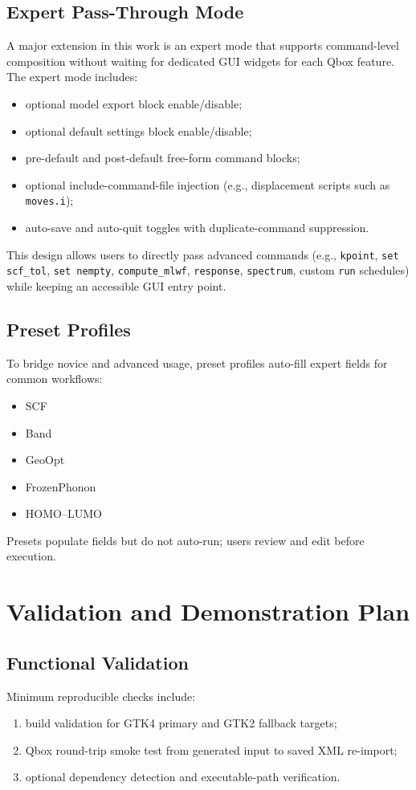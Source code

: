 \documentclass[11pt,a4paper]{article}
\begin{document}
\subsection{Expert Pass-Through Mode}
A major extension in this work is an expert mode that supports command-level composition without waiting for dedicated GUI widgets for each Qbox feature.
The expert mode includes:
\begin{itemize}
  \item optional model export block enable/disable;
  \item optional default settings block enable/disable;
  \item pre-default and post-default free-form command blocks;
  \item optional include-command-file injection (e.g., displacement scripts such as \texttt{moves.i});
  \item auto-save and auto-quit toggles with duplicate-command suppression.
\end{itemize}

This design allows users to directly pass advanced commands (e.g., \texttt{kpoint}, \texttt{set scf\_tol}, \texttt{set nempty}, \texttt{compute\_mlwf}, \texttt{response}, \texttt{spectrum}, custom \texttt{run} schedules) while keeping an accessible GUI entry point.

\subsection{Preset Profiles}
To bridge novice and advanced usage, preset profiles auto-fill expert fields for common workflows:
\begin{itemize}
  \item SCF
  \item Band
  \item GeoOpt
  \item FrozenPhonon
  \item HOMO--LUMO
\end{itemize}
Presets populate fields but do not auto-run; users review and edit before execution.

\section{Validation and Demonstration Plan}
\subsection{Functional Validation}
Minimum reproducible checks include:
\begin{enumerate}
  \item build validation for GTK4 primary and GTK2 fallback targets;
  \item Qbox round-trip smoke test from generated input to saved XML re-import;
  \item optional dependency detection and executable-path verification.
\end{enumerate}
\end{document}
